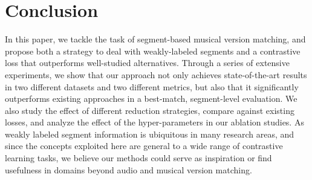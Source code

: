 
\section{Conclusion}

In this paper, we tackle the task of segment-based musical version matching, and propose both a strategy to deal with weakly-labeled segments and a contrastive loss that outperforms well-studied alternatives. Through a series of extensive experiments, we show that our approach not only achieves state-of-the-art results in two different datasets and two different metrics, but also that it significantly outperforms existing approaches in a best-match, segment-level evaluation. We also study the effect of different reduction strategies, compare against existing losses, and analyze the effect of the hyper-parameters in our ablation studies. As weakly labeled segment information is ubiquitous in many research areas, and since the concepts exploited here are general to a wide range of contrastive learning tasks, we believe our methods could serve as inspiration or find usefulness in domains beyond audio and musical version matching.

